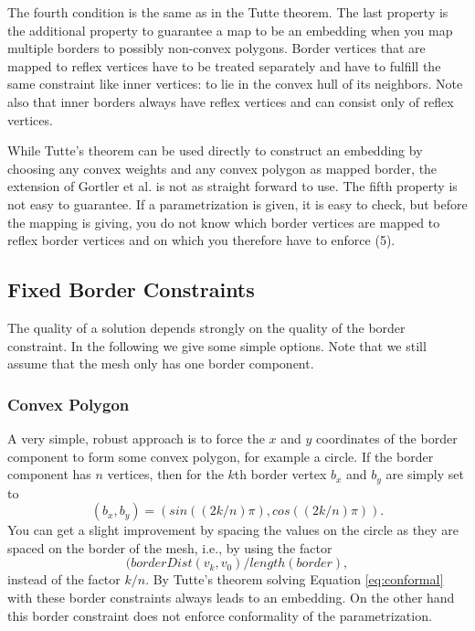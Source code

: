 The fourth condition is the same as in the Tutte theorem. The last property is the additional property to guarantee a map to be an embedding when you map multiple borders to possibly non-convex polygons. Border vertices that are mapped to reflex vertices have to be treated separately and have to fulfill the same constraint like inner vertices: to lie in the convex hull of its neighbors. Note also that inner borders always have reflex vertices and can consist only of reflex vertices.

While Tutte's theorem can be used directly to construct an embedding by choosing any convex weights and any convex polygon as mapped border, the extension of Gortler et al. is not as straight forward to use. The fifth property is not easy to guarantee. If a parametrization is given, it is easy to check, but before the mapping is giving, you do not know which border vertices are mapped to reflex border vertices and on which you therefore have to enforce (5). 

\subsection{Fixed Border Constraints}
The quality of a solution depends strongly on the quality of the border constraint. In the following we give some simple options. Note that we still assume that the mesh only has one border component.

\subsubsection*{Convex Polygon}
A very simple, robust approach is to force the $x$ and $y$ coordinates of the border component to form some convex polygon, for example a circle. If the border component has $n$ vertices, then for the $k$th border vertex $b_x$ and $b_y$ are simply set to
\[(b_x,b_y) = (sin((2k/n)\pi),cos((2k/n)\pi)).\] 
You can get a slight improvement by spacing the values on the circle as they are spaced on the border of the mesh, i.e., by using the factor 
\[(borderDist(v_k,v_0)/length(border),\] 
instead of the factor $k/n$. By Tutte's theorem solving Equation \ref{eq:conformal} with these border constraints always leads to an embedding. On the other hand this border constraint does not enforce conformality of the parametrization.

